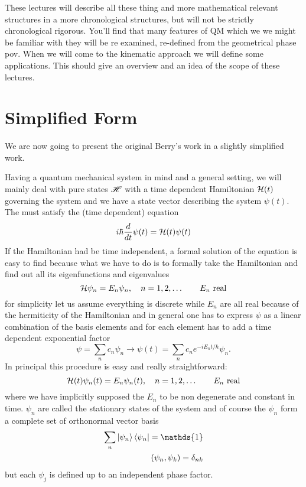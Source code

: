 These lectures will describe all these thing and more mathematical relevant structures in a more chronological structures, but will not be strictly chronological rigorous. You'll find that many features of QM which we we might be familiar with they will be re examined, re-defined from the geometrical phase pov. When we will come to the kinematic approach we will define some applications. This should give an overview and an idea of the scope of these lectures.   
\section{Simplified Form}
We are now going to present the original Berry's work in a slightly simplified work. 

Having a quantum mechanical system in mind and a general setting, we will mainly deal with pure states $ \mathscr{H} $ with a time dependent Hamiltonian $ \mathcal{H}(t) $ governing the system and we have a state vector describing the system $ \psi(t) $.
The \wf must satisfy the (time dependent) \Sch equation 
\begin{equation}
i\hbar \frac{d}{dt}\psi(t)=\mathcal{H}(t)\psi(t)
\label{eq:2.1}
\end{equation}
If the Hamiltonian had be time independent, a formal solution of the \Sch equation is easy to find because what we have to do is to formally take the Hamiltonian and find out all its eigenfunctions and eigenvalues
\begin{equation}
\mathcal{H} \psi_n=E_n\psi_n, \quad n=1,2,\dots \qquad E_n \text{ real} 
\end{equation}
for simplicity let us assume everything is discrete while $ E_n $ are all real because of the hermiticity of the Hamiltonian and in general one has to express $ \psi $ as a linear combination of the basis elements and for each element has to add a time dependent exponential factor
\begin{equation}
\psi=\sum_n c_n\psi_n\to \psi(t)=\sum_n c_n e^{-iE_nt/\hbar}\psi_n.
\end{equation}
In principal this procedure is easy and really straightforward:
\begin{equation}
\mathcal{H}(t)\psi_n(t)=E_n\psi_n(t), \quad n=1,2,\dots \qquad E_n \text{ real}
\end{equation}
where we have implicitly supposed the $ E_n $ to be non degenerate and constant in time. $ \psi_n $ are called the stationary states of the system and of course the $ \psi_n $ form a complete set of orthonormal vector basis
\begin{align}
	\sum_n \Ket{\psi_n}\Bra{\psi_n}=\mathds{1}\\
	\left(\psi_n,\psi_k\right) = \delta_{nk}
\end{align}
but each $ \psi_j $ is defined up to an independent phase factor.


